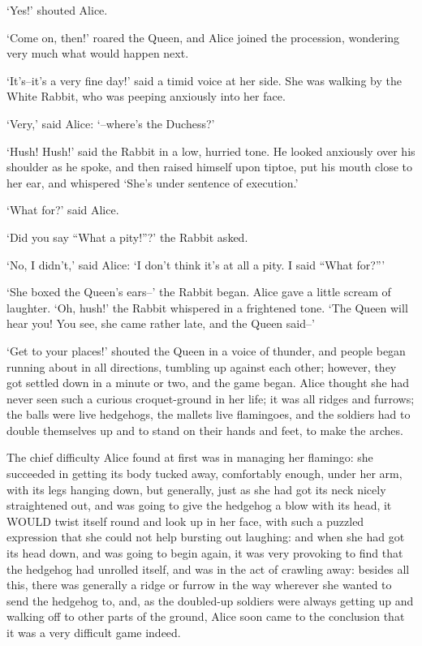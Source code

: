 \documentclass[12pt]{book}
\begin{document}
  `Yes!' shouted Alice.

  `Come on, then!' roared the Queen, and Alice joined the
procession, wondering very much what would happen next.

  `It's--it's a very fine day!' said a timid voice at her side.
She was walking by the White Rabbit, who was peeping anxiously
into her face.

  `Very,' said Alice:  `--where's the Duchess?'

  `Hush!  Hush!' said the Rabbit in a low, hurried tone.  He
looked anxiously over his shoulder as he spoke, and then raised
himself upon tiptoe, put his mouth close to her ear, and
whispered `She's under sentence of execution.'

  `What for?' said Alice.

  `Did you say ``What a pity!''?' the Rabbit asked.

  `No, I didn't,' said Alice:  `I don't think it's at all a pity.
I said ``What for?'''

  `She boxed the Queen's ears--' the Rabbit began.  Alice gave a
little scream of laughter.  `Oh, hush!' the Rabbit whispered in a
frightened tone.  `The Queen will hear you!  You see, she came
rather late, and the Queen said--'

  `Get to your places!' shouted the Queen in a voice of thunder,
and people began running about in all directions, tumbling up
against each other; however, they got settled down in a minute or
two, and the game began.  Alice thought she had never seen such a
curious croquet-ground in her life; it was all ridges and
furrows; the balls were live hedgehogs, the mallets live
flamingoes, and the soldiers had to double themselves up and to
stand on their hands and feet, to make the arches.

  The chief difficulty Alice found at first was in managing her
flamingo:  she succeeded in getting its body tucked away,
comfortably enough, under her arm, with its legs hanging down,
but generally, just as she had got its neck nicely straightened
out, and was going to give the hedgehog a blow with its head, it
WOULD twist itself round and look up in her face, with such a
puzzled expression that she could not help bursting out laughing:
and when she had got its head down, and was going to begin again,
it was very provoking to find that the hedgehog had unrolled
itself, and was in the act of crawling away:  besides all this,
there was generally a ridge or furrow in the way wherever she
wanted to send the hedgehog to, and, as the doubled-up soldiers
were always getting up and walking off to other parts of the
ground, Alice soon came to the conclusion that it was a very
difficult game indeed.
\end{document}
